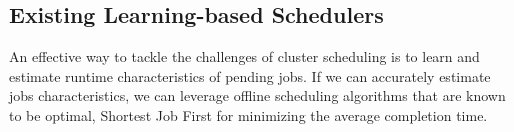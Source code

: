 

\subsection{Existing Learning-based Schedulers}
\label{sec:back:existing}

An effective way to tackle the challenges of cluster scheduling is to
learn and estimate runtime characteristics of pending jobs. If we can accurately
estimate jobs characteristics, we can leverage offline scheduling
algorithms that are known to be optimal, \eg Shortest Job First
for minimizing the average completion time.


